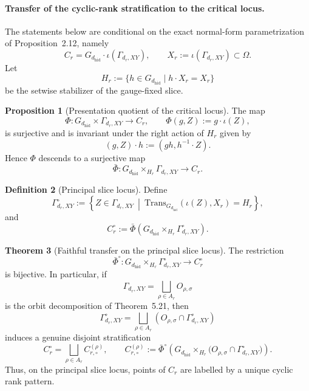 \documentclass{article}
\theoremstyle{definition}
\newtheorem{theorem}{Theorem}[section]
\newtheorem{proposition}[theorem]{Proposition}
\newtheorem{definition}[theorem]{Definition}
\begin{document}

\paragraph{Transfer of the cyclic-rank stratification to the critical locus.}
The statements below are conditional on the exact normal-form parametrization of
Proposition~2.12, namely
\[
C_r = G_{d_{\mathrm{hid}}}\cdot \iota(\Gamma_{d_r,XY}),
\qquad
X_r:=\iota(\Gamma_{d_r,XY})\subset \Omega .
\]
Let
\[
H_r:=\{h\in G_{d_{\mathrm{hid}}}\mid h\cdot X_r=X_r\}
\]
be the setwise stabilizer of the gauge-fixed slice.

\begin{proposition}[Presentation quotient of the critical locus]
The map
\[
\Phi:G_{d_{\mathrm{hid}}}\times \Gamma_{d_r,XY}\longrightarrow C_r,
\qquad
\Phi(g,Z):=g\cdot \iota(Z),
\]
is surjective and is invariant under the right action of \(H_r\) given by
\[
(g,Z)\cdot h := (gh,h^{-1}\!\cdot Z).
\]
Hence \(\Phi\) descends to a surjective map
\[
\bar\Phi:G_{d_{\mathrm{hid}}}\times_{H_r}\Gamma_{d_r,XY}\longrightarrow C_r.
\]
\end{proposition}

\begin{definition}[Principal slice locus]
Define
\[
\Gamma_{d_r,XY}^{\circ}
:=
\left\{
Z\in \Gamma_{d_r,XY}\ \middle|\
\text{Trans}_{G_{d_{\mathrm{hid}}}}(\iota(Z),X_r)=H_r
\right\},
\]
and
\[
C_r^{\circ}:=
\bar\Phi\!\left(G_{d_{\mathrm{hid}}}\times_{H_r}\Gamma_{d_r,XY}^{\circ}\right).
\]
\end{definition}

\begin{theorem}[Faithful transfer on the principal slice locus]
The restriction
\[
\bar\Phi^{\circ}:
G_{d_{\mathrm{hid}}}\times_{H_r}\Gamma_{d_r,XY}^{\circ}
\longrightarrow
C_r^{\circ}
\]
is bijective. In particular, if
\[
\Gamma_{d_r,XY}=\bigsqcup_{\rho\in A_r} O_{\rho,\sigma}
\]
is the orbit decomposition of Theorem~5.21, then
\[
\Gamma_{d_r,XY}^{\circ}
=
\bigsqcup_{\rho\in A_r}
\left(O_{\rho,\sigma}\cap \Gamma_{d_r,XY}^{\circ}\right)
\]
induces a genuine disjoint stratification
\[
C_r^{\circ}
=
\bigsqcup_{\rho\in A_r}
C_{r,\circ}^{(\rho)},
\qquad
C_{r,\circ}^{(\rho)}
:=
\bar\Phi^{\circ}\!\left(
G_{d_{\mathrm{hid}}}\times_{H_r}
\bigl(O_{\rho,\sigma}\cap \Gamma_{d_r,XY}^{\circ}\bigr)
\right).
\]
Thus, on the principal slice locus, points of \(C_r\) are labelled by a unique cyclic
rank pattern.
\end{theorem}
\end{document}

